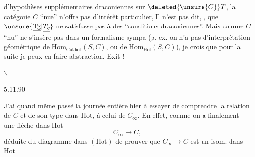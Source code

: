 d'hypothèses supplémentaires draconiennes sur $\deleted{\unsure{C}}T$, la catégorie $C$ ``nue'' n'offre pas d'intérêt particulier,  Il n'est pas dit, , que $\unsure{\underline{\mathrm{Tg}}|\underline{T_g}}$ ne satisfasse pas à des ``conditions draconiennes''. Mais comme $C$ ``nu'' ne  s'insère pas dans un formalisme sympa (p. ex. on n'a pas d'interprétation géométrique de $\mathrm{Hom}_{\mathrm{Cat\,hot}}(S,C)$, ou de $\mathrm{Hom}_{\mathrm{Hot}}(S,C)$), je crois que pour la suite je peux en faire abstraction. Exit  !

\hfill$\backslash$\hfill\mbox{}

\hfill 5.11.90

J'ai quand même passé la journée entière hier à essayer de comprendre la relation de $C$ et de son type dans $\mathrm{Hot}$, à celui de $C_\infty$. En effet, comme on a finalement une flèche dans $\mathrm{Hot}$
\[
C_\infty\longrightarrow C,
\]
déduite du diagramme dans $(\mathrm{Hot})$
de prouver que $C_\infty\longrightarrow C$ est un isom. dans $\mathrm{Hot}$
